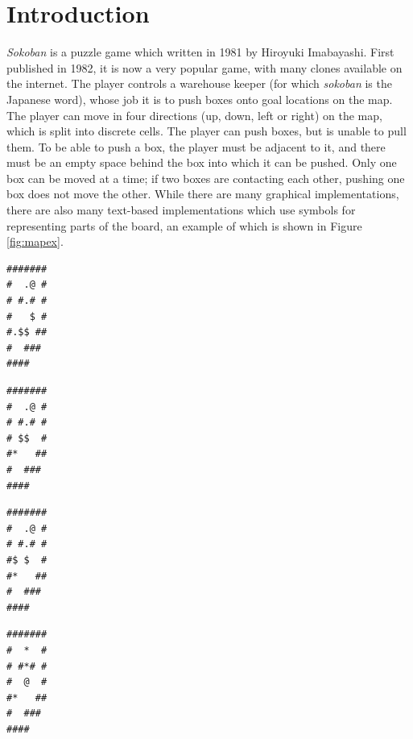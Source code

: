 \documentclass[a4paper,11pt]{article}
\begin{document}
\section{Introduction}
\emph{Sokoban} is a puzzle game which written in 1981 by Hiroyuki
Imabayashi. First published in 1982, it is now a very popular game, with many
clones available on the internet. The player controls a warehouse keeper (for
which \emph{sokoban} is the Japanese word), whose job it is to push boxes onto
goal locations on the map. The player can move in four directions (up, down,
left or right) on the map, which is split into discrete cells. The player can
push boxes, but is unable to pull them. To be able to push a box, the player
must be adjacent to it, and there must be an empty space behind the box into
which it can be pushed. Only one box can be moved at a time; if two boxes are
contacting each other, pushing one box does not move the other. While there are
many graphical implementations, there are also many text-based implementations
which use symbols for representing parts of the board, an example of which is
shown in Figure \ref{fig:mapex}.

\begin{lrbox}{\boxone}
  \begin{minipage}{.25\textwidth}
\centering
\begin{BVerbatim}
#######
#  .@ #
# #.# #
#   $ #
#.$$ ##
#  ###
####
\end{BVerbatim}
  \end{minipage}
\end{lrbox}%

\begin{lrbox}{\boxtwo}
  \begin{minipage}{.25\textwidth}
\centering
\begin{BVerbatim}
#######
#  .@ #
# #.# #
# $$  #
#*   ##
#  ###
####
\end{BVerbatim}
  \end{minipage}
\end{lrbox}%

\begin{lrbox}{\boxthree}
  \begin{minipage}{.25\textwidth}
\centering
\begin{BVerbatim}
#######
#  .@ #
# #.# #
#$ $  #
#*   ##
#  ###
####
\end{BVerbatim}
  \end{minipage}
\end{lrbox}%

\begin{lrbox}{\boxfour}
  \begin{minipage}{.25\textwidth}
\centering
\begin{BVerbatim}
#######
#  *  #
# #*# #
#  @  #
#*   ##
#  ###
####
\end{BVerbatim}
  \end{minipage}
\end{lrbox}%
\end{document}
